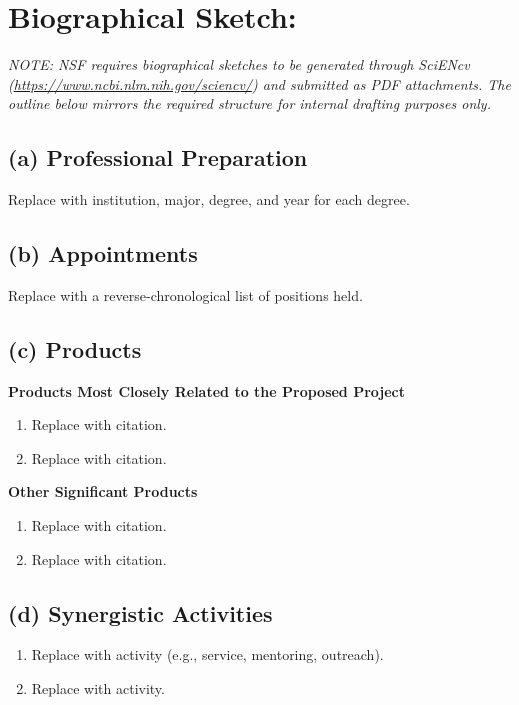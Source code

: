 \section*{Biographical Sketch: \piName}

\textit{NOTE: NSF requires biographical sketches to be generated
through SciENcv (\url{https://www.ncbi.nlm.nih.gov/sciencv/}) and
submitted as PDF attachments. The outline below mirrors the required
structure for internal drafting purposes only.}

\subsection*{(a) Professional Preparation}
Replace with institution, major, degree, and year for each degree.

\subsection*{(b) Appointments}
Replace with a reverse-chronological list of positions held.

\subsection*{(c) Products}
\textbf{Products Most Closely Related to the Proposed Project}
\begin{enumerate}[leftmargin=*]
  \item Replace with citation.
  \item Replace with citation.
\end{enumerate}

\textbf{Other Significant Products}
\begin{enumerate}[leftmargin=*]
  \item Replace with citation.
  \item Replace with citation.
\end{enumerate}

\subsection*{(d) Synergistic Activities}
\begin{enumerate}[leftmargin=*]
  \item Replace with activity (e.g., service, mentoring, outreach).
  \item Replace with activity.
\end{enumerate}
